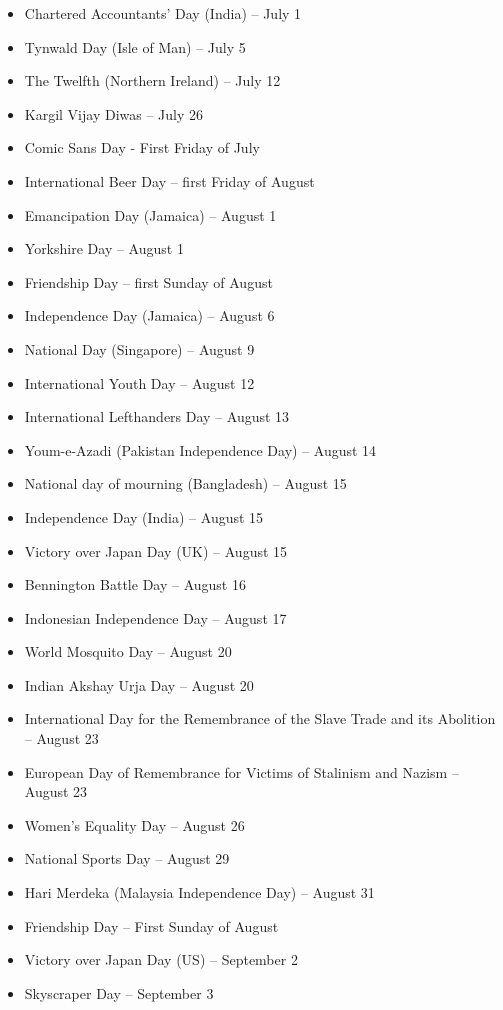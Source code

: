 \documentclass[
]{book}
\begin{document}
\begin{itemize}
\item
  Chartered Accountants' Day (India) -- July 1
\item
  Tynwald Day (Isle of Man) -- July 5
\item
  The Twelfth (Northern Ireland) -- July 12
\item
  Kargil Vijay Diwas -- July 26
\item
  Comic Sans Day - First Friday of July
\item
  International Beer Day -- first Friday of August
\item
  Emancipation Day (Jamaica) -- August 1
\item
  Yorkshire Day -- August 1
\item
  Friendship Day -- first Sunday of August
\item
  Independence Day (Jamaica) -- August 6
\item
  National Day (Singapore) -- August 9
\item
  International Youth Day -- August 12
\item
  International Lefthanders Day -- August 13
\item
  Youm-e-Azadi (Pakistan Independence Day) -- August 14
\item
  National day of mourning (Bangladesh) -- August 15
\item
  Independence Day (India) -- August 15
\item
  Victory over Japan Day (UK) -- August 15
\item
  Bennington Battle Day -- August 16
\item
  Indonesian Independence Day -- August 17
\item
  World Mosquito Day -- August 20
\item
  Indian Akshay Urja Day -- August 20
\item
  International Day for the Remembrance of the Slave Trade and its Abolition -- August 23
\item
  European Day of Remembrance for Victims of Stalinism and Nazism -- August 23
\item
  Women's Equality Day -- August 26
\item
  National Sports Day -- August 29
\item
  Hari Merdeka (Malaysia Independence Day) -- August 31
\item
  Friendship Day -- First Sunday of August
\item
  Victory over Japan Day (US) -- September 2
\item
  Skyscraper Day -- September 3

\end{itemize}
\end{document}
